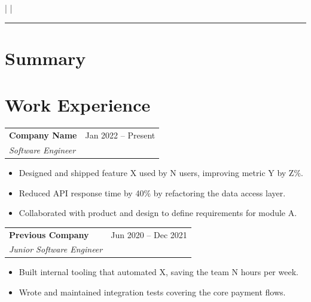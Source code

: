 \documentclass[10pt, a4paper]{article}
\makeatletter
\newcommand{\contactitem}[1]{\small #1}
\newcommand{\workentry}[4]{%
  \noindent
  \begin{tabularx}{\linewidth}{@{}X r@{}}
    \textbf{#1} & \textcolor{subtle}{\small #3} \\
    \textit{\small #2} &
  \end{tabularx}
  \vspace{1pt}
  #4
  \vspace{6pt}
}
\makeatother
\begin{document}

\begin{center}
  {\LARGE\bfseries\color{accent} \VarName}\\[4pt]
  {\small \VarRole}\\[6pt]
  \contactitem{\VarEmail}
  \quad\textcolor{subtle}{|}\quad
  \contactitem{\VarPhone}
  \quad\textcolor{subtle}{|}\quad
  \contactitem{\VarLocation}
\end{center}

\vspace{4pt}
\textcolor{accent}{\rule{\linewidth}{0.8pt}}
\vspace{6pt}

\section{Summary}
\VarSummary

\section{Work Experience}
\workentry{Company Name}{Software Engineer}{Jan 2022 -- Present}{%
  \begin{itemize}
    \item Designed and shipped feature X used by N users, improving metric Y by Z\%.
    \item Reduced API response time by 40\% by refactoring the data access layer.
    \item Collaborated with product and design to define requirements for module A.
  \end{itemize}
}

\workentry{Previous Company}{Junior Software Engineer}{Jun 2020 -- Dec 2021}{%
  \begin{itemize}
    \item Built internal tooling that automated X, saving the team N hours per week.
    \item Wrote and maintained integration tests covering the core payment flows.
  \end{itemize}
}

\end{document}
